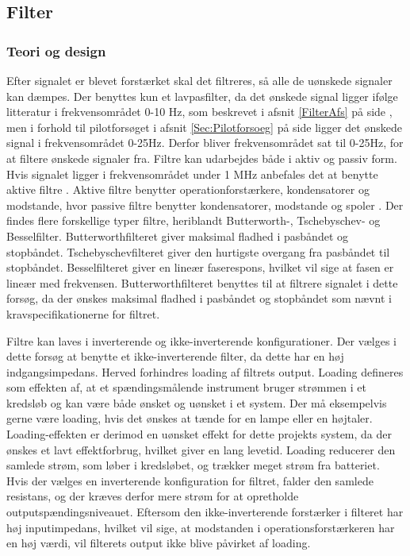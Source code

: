 \subsection{Filter}
\subsubsection{Teori og design}
Efter signalet er blevet forstærket skal det filtreres, så alle de uønskede signaler kan dæmpes. Der benyttes kun et lavpasfilter, da det ønskede signal ligger ifølge litteratur i frekvensområdet 0-10 Hz, som beskrevet i afsnit \ref{FilterAfs} på side \pageref{FilterAfs}, men i forhold til pilotforsøget i afsnit \ref{Sec:Pilotforsoeg} på side \pageref{Sec:Pilotfosoeg} ligger det ønskede signal i frekvensområdet 0-25Hz. Derfor bliver frekvensområdet sat til 0-25Hz, for at filtere ønskede signaler fra. Filtre kan udarbejdes både i aktiv og passiv form. Hvis signalet ligger i frekvensområdet under 1 MHz anbefales det at benytte aktive filtre \cite{Carter2013}. Aktive filtre benytter operationforstærkere, kondensatorer og modstande, hvor passive filtre benytter kondensatorer, modstande og spoler \cite{Carter2013}. Der findes flere forskellige typer filtre, heriblandt Butterworth-, Tschebyschev- og Besselfilter. Butterworthfilteret giver maksimal fladhed i pasbåndet og stopbåndet. Tschebyschevfilteret giver den hurtigste overgang fra pasbåndet til stopbåndet. Besselfilteret giver en lineær faserespons, hvilket vil sige at fasen er lineær med frekvensen. \cite{Carter2013} Butterworthfilteret benyttes til at filtrere signalet i dette forsøg, da der ønskes maksimal fladhed i pasbåndet og stopbåndet som nævnt i kravspecifikationerne for filtret.

Filtre kan laves i inverterende og ikke-inverterende konfigurationer. Der vælges i dette forsøg at benytte et ikke-inverterende filter, da dette har en høj indgangsimpedans. Herved forhindres loading af filtrets output. Loading defineres som effekten af, at et spændingsmålende instrument bruger strømmen i et kredsløb og kan være både ønsket og uønsket i et system. Der må eksempelvis gerne være loading, hvis det ønskes at tænde for en lampe eller en højtaler. Loading-effekten er derimod en uønsket effekt for dette projekts system, da der ønskes et lavt effektforbrug, hvilket giver en lang levetid. Loading reducerer den samlede strøm, som løber i kredsløbet, og trækker meget strøm fra batteriet. \\
Hvis der vælges en inverterende konfiguration for filtret, falder den samlede resistans, og der kræves derfor mere strøm for at opretholde outputspændingsniveauet. Eftersom den ikke-inverterende forstærker i filteret har høj inputimpedans, hvilket vil sige, at modstanden i operationsforstærkeren har en høj værdi, vil filterets output ikke blive påvirket af loading. \cite{Webster2009,Carter2013,Karni2014}

